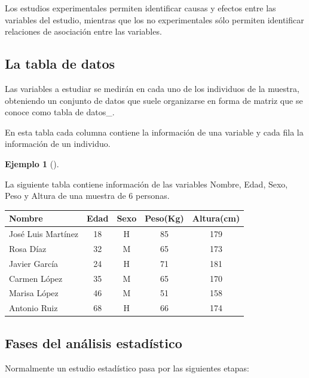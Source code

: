\documentclass[
  spanish,
  a4paper,
]{scrreport}
\newcounter{none} %
\theoremstyle{plain}
\theoremstyle{definition}
\newtheorem{example}{Ejemplo}[chapter]
\theoremstyle{definition}
\theoremstyle{remark}
\begin{document}
Los estudios experimentales permiten identificar causas y efectos entre
las variables del estudio, mientras que los no experimentales sólo
permiten identificar relaciones de asociación entre las variables.

\subsection{La tabla de datos}\label{la-tabla-de-datos}

Las variables a estudiar se medirán en cada uno de los individuos de la
muestra, obteniendo un conjunto de datos que suele organizarse en forma
de matriz que se conoce como tabla de datos\_.

En esta tabla cada columna contiene la información de una variable y
cada fila la información de un individuo.

\begin{example}[]\protect\hypertarget{exm-tabla-datos}{}\label{exm-tabla-datos}

La siguiente tabla contiene información de las variables Nombre, Edad,
Sexo, Peso y Altura de una muestra de 6 personas.

{\def\LTcaptype{none} %
\begin{longtable}[]{@{}lcccc@{}}
\toprule\noalign{}
Nombre & Edad & Sexo & Peso(Kg) & Altura(cm) \\
\midrule\noalign{}
\endhead
\bottomrule\noalign{}
\endlastfoot
José Luis Martínez & 18 & H & 85 & 179 \\
Rosa Díaz & 32 & M & 65 & 173 \\
Javier García & 24 & H & 71 & 181 \\
Carmen López & 35 & M & 65 & 170 \\
Marisa López & 46 & M & 51 & 158 \\
Antonio Ruiz & 68 & H & 66 & 174 \\
\end{longtable}
}

\end{example}

\subsection{Fases del análisis
estadístico}\label{fases-del-anuxe1lisis-estaduxedstico}

Normalmente un estudio estadístico pasa por las siguientes etapas:
\end{document}
